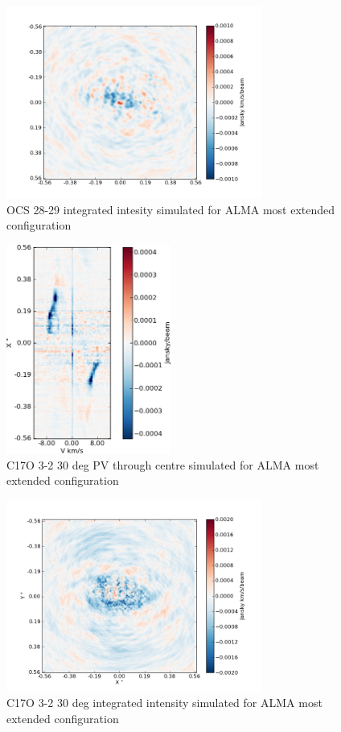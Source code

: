 \documentclass[useAMS,usenatbib]{mn2e}
\begin{document}
\begin{figure}
 \includegraphics[width=84mm]{Figures/sim/casa_OCS_28-27_mom0.png}

 \caption{OCS 28-29 integrated intesity simulated for ALMA most extended configuration}
\end{figure}


\begin{figure}
 \includegraphics[width=54mm]{Figures/sim/casa_C17O_3-2_pv.png}

 \caption{C17O 3-2 30 deg PV through centre simulated for ALMA most extended configuration}
\end{figure}

\begin{figure}
 \includegraphics[width=84mm]{Figures/sim/casa_C17O_3-2_mom0.png}

 \caption{C17O 3-2 30 deg integrated intensity simulated for ALMA most extended configuration}
\end{figure}
\end{document}
